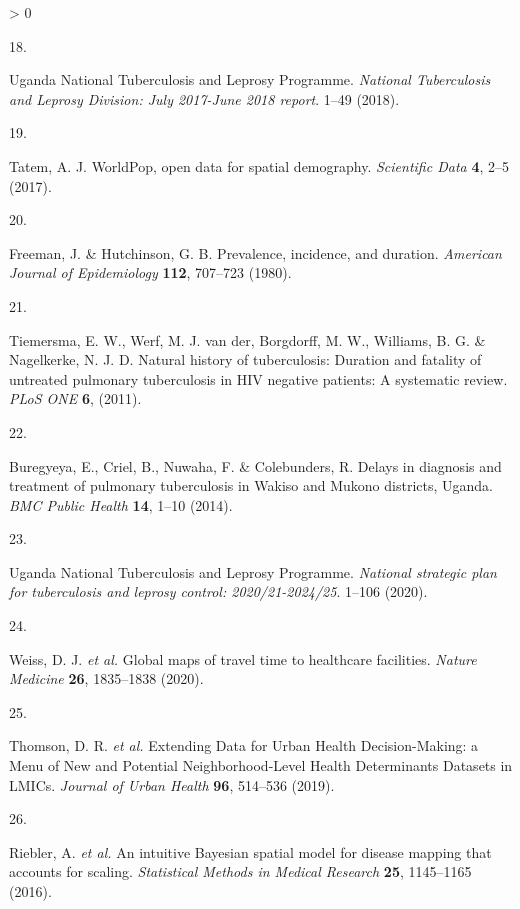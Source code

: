 \documentclass[
]{article}
\newlength{\cslhangindent}
\newlength{\csllabelwidth}
\newenvironment{CSLReferences}[2] %
 {%
  \setlength{\parindent}{0pt}
  \ifodd #1 \everypar{\setlength{\hangindent}{\cslhangindent}}\ignorespaces\fi
  \ifnum #2 > 0
  \setlength{\parskip}{#2\baselineskip}
  \fi
 }%
 {}
\newcommand{\CSLLeftMargin}[1]{\parbox[t]{\csllabelwidth}{#1}}
\newcommand{\CSLRightInline}[1]{\parbox[t]{\linewidth - \csllabelwidth}{#1}\break}
\begin{document}
\begin{CSLReferences}{0}{0}
\leavevmode\hypertarget{ref-UgandaNationalTuberculosisandLeprosyProgramme2018}{}%
\CSLLeftMargin{18. }
\CSLRightInline{Uganda National Tuberculosis and Leprosy Programme. \emph{{National Tuberculosis and Leprosy Division: July 2017-June 2018 report}}. 1--49 (2018).}

\leavevmode\hypertarget{ref-Tatem2017}{}%
\CSLLeftMargin{19. }
\CSLRightInline{Tatem, A. J. {WorldPop, open data for spatial demography}. \emph{Scientific Data} \textbf{4}, 2--5 (2017).}

\leavevmode\hypertarget{ref-Freeman1980}{}%
\CSLLeftMargin{20. }
\CSLRightInline{Freeman, J. \& Hutchinson, G. B. {Prevalence, incidence, and duration}. \emph{American Journal of Epidemiology} \textbf{112}, 707--723 (1980).}

\leavevmode\hypertarget{ref-Tiemersma2011}{}%
\CSLLeftMargin{21. }
\CSLRightInline{Tiemersma, E. W., Werf, M. J. van der, Borgdorff, M. W., Williams, B. G. \& Nagelkerke, N. J. D. {Natural history of tuberculosis: Duration and fatality of untreated pulmonary tuberculosis in HIV negative patients: A systematic review}. \emph{PLoS ONE} \textbf{6}, (2011).}

\leavevmode\hypertarget{ref-Buregyeya2014}{}%
\CSLLeftMargin{22. }
\CSLRightInline{Buregyeya, E., Criel, B., Nuwaha, F. \& Colebunders, R. {Delays in diagnosis and treatment of pulmonary tuberculosis in Wakiso and Mukono districts, Uganda}. \emph{BMC Public Health} \textbf{14}, 1--10 (2014).}

\leavevmode\hypertarget{ref-UgandaNationalTuberculosisandLeprosyProgramme2020a}{}%
\CSLLeftMargin{23. }
\CSLRightInline{Uganda National Tuberculosis and Leprosy Programme. \emph{{National strategic plan for tuberculosis and leprosy control: 2020/21-2024/25}}. 1--106 (2020).}

\leavevmode\hypertarget{ref-Weiss2020}{}%
\CSLLeftMargin{24. }
\CSLRightInline{Weiss, D. J. \emph{et al.} {Global maps of travel time to healthcare facilities}. \emph{Nature Medicine} \textbf{26}, 1835--1838 (2020).}

\leavevmode\hypertarget{ref-Thomson2019}{}%
\CSLLeftMargin{25. }
\CSLRightInline{Thomson, D. R. \emph{et al.} {Extending Data for Urban Health Decision-Making: a Menu of New and Potential Neighborhood-Level Health Determinants Datasets in LMICs}. \emph{Journal of Urban Health} \textbf{96}, 514--536 (2019).}

\leavevmode\hypertarget{ref-Riebler2016}{}%
\CSLLeftMargin{26. }
\CSLRightInline{Riebler, A. \emph{et al.} {An intuitive Bayesian spatial model for disease mapping that accounts for scaling}. \emph{Statistical Methods in Medical Research} \textbf{25}, 1145--1165 (2016).}


\end{CSLReferences}
\end{document}

